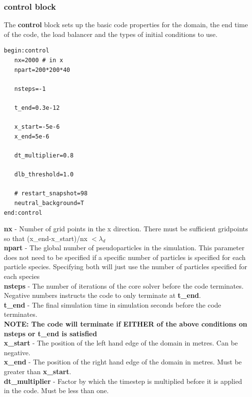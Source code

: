 \documentclass[12pt,a4paper]{article}
\newcommand{\emphtext}{\color{warwickdark} \fontfamily{phv}\selectfont\Large\bf}
\newcommand{\boxverbatim}[1]{\begin{Verbatim}[obeytabs=true,frame=single,
  framerule=0.5mm,rulecolor=\color{warwickmid},formatcom=\color{black},label=#1]}
\newcommand{\inlineemph}[1]{{\color{warwicklight} \bf{#1}}}
\newcommand{\cemph}[1]{{\inlineemph{#1}}}
\begin{document}
\subsubsection{\cemph{control} block}
The \cemph{control} block sets up the basic code properties for the
domain, the end time of the code, the load balancer and the types of initial
conditions to use.

\boxverbatim{control block}
begin:control
   nx=2000 # in x
   npart=200*200*40

   nsteps=-1

   t_end=0.3e-12

   x_start=-5e-6
   x_end=5e-6

   dt_multiplier=0.8

   dlb_threshold=1.0

   # restart_snapshot=98
   neutral_background=T
end:control
\end{Verbatim}


{\emphtext nx} - Number of grid points in the x direction. There must be
sufficient gridpoints so that (x\_end-x\_start)/nx $< \lambda_d$\\

{\emphtext npart} - The global number of pseudoparticles in the
simulation. This parameter does not need to be specified if a specific number
of particles is specified for each particle species. Specifying both will just
use the number of particles specified for each species\\

{\emphtext nsteps} - The number of iterations of the core solver before the
code terminates. Negative numbers instructs the code to only terminate at
\inlineemph{t\_end}.\\

{\emphtext t\_end} - The final simulation time in simulation seconds before the
code terminates.\\

{\emphtext NOTE: The code will terminate if EITHER of the above conditions on
nsteps or t\_end is satisfied}\\

{\emphtext x\_start} - The position of the left hand edge of the domain in
metres. Can be negative.\\

{\emphtext x\_end} - The position of the right hand edge of the domain in
metres. Must be greater than \inlineemph{x\_start}.\\

{\emphtext dt\_multiplier} - Factor by which the timestep is multiplied before
it is applied in the code. Must be less than one.\\
\end{document}
